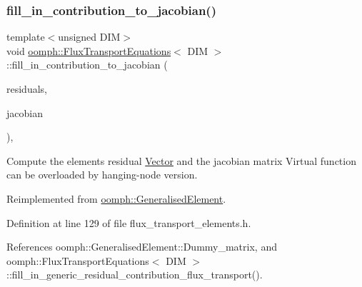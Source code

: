 \subsubsection{\texorpdfstring{fill\+\_\+in\+\_\+contribution\+\_\+to\+\_\+jacobian()}{fill\_in\_contribution\_to\_jacobian()}}
{\footnotesize\ttfamily template$<$unsigned D\+IM$>$ \\
void \hyperlink{classoomph_1_1FluxTransportEquations}{oomph\+::\+Flux\+Transport\+Equations}$<$ D\+IM $>$\+::fill\+\_\+in\+\_\+contribution\+\_\+to\+\_\+jacobian (\begin{DoxyParamCaption}\item[{\hyperlink{classoomph_1_1Vector}{Vector}$<$ double $>$ \&}]{residuals,  }\item[{\hyperlink{classoomph_1_1DenseMatrix}{Dense\+Matrix}$<$ double $>$ \&}]{jacobian }\end{DoxyParamCaption})\hspace{0.3cm}{\ttfamily [inline]}, {\ttfamily [virtual]}}



Compute the element\textquotesingle{}s residual \hyperlink{classoomph_1_1Vector}{Vector} and the jacobian matrix Virtual function can be overloaded by hanging-\/node version. 



Reimplemented from \hyperlink{classoomph_1_1GeneralisedElement_a6ae09fc0d68e4309ac1b03583d252845}{oomph\+::\+Generalised\+Element}.



Definition at line 129 of file flux\+\_\+transport\+\_\+elements.\+h.



References oomph\+::\+Generalised\+Element\+::\+Dummy\+\_\+matrix, and oomph\+::\+Flux\+Transport\+Equations$<$ D\+I\+M $>$\+::fill\+\_\+in\+\_\+generic\+\_\+residual\+\_\+contribution\+\_\+flux\+\_\+transport().

\mbox{\label{classoomph_1_1FluxTransportEquations_ac3c3ab10011367a880104ec6d05ab9a9}} 

